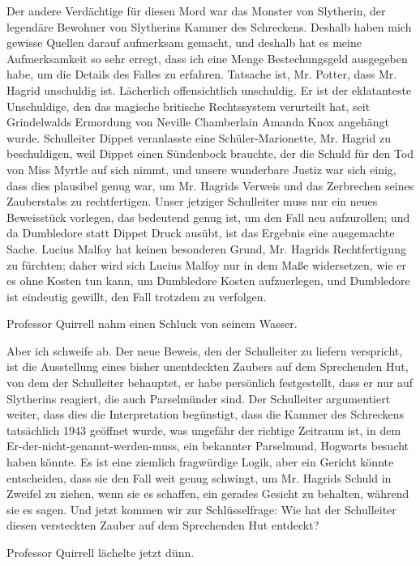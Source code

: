 \glqq{}Der andere Verdächtige für diesen Mord war das Monster von Slytherin, der
legendäre Bewohner von Slytherins Kammer des Schreckens. Deshalb haben mich
gewisse Quellen darauf aufmerksam gemacht, und deshalb hat es meine
Aufmerksamkeit so sehr erregt, dass ich eine Menge Bestechungsgeld ausgegeben
habe, um die Details des Falles zu erfahren. Tatsache ist, Mr. Potter, dass Mr.
Hagrid unschuldig ist. Lächerlich offensichtlich unschuldig. Er ist der
eklatanteste Unschuldige, den das magische britische Rechtssystem verurteilt
hat, seit Grindelwalds Ermordung von Neville Chamberlain Amanda Knox angehängt
wurde. Schulleiter Dippet veranlasste eine Schüler-Marionette, Mr. Hagrid zu
beschuldigen, weil Dippet einen Sündenbock brauchte, der die Schuld für den Tod
von Miss Myrtle auf sich nimmt, und unsere wunderbare Justiz war sich einig,
dass dies plausibel genug war, um Mr. Hagrids Verweis und das Zerbrechen seines
Zauberstabs zu rechtfertigen. Unser jetziger Schulleiter muss nur ein neues
Beweisstück vorlegen, das bedeutend genug ist, um den Fall neu aufzurollen; und
da Dumbledore statt Dippet Druck ausübt, ist das Ergebnis eine ausgemachte
Sache. Lucius Malfoy hat keinen besonderen Grund, Mr. Hagrids Rechtfertigung zu
fürchten; daher wird sich Lucius Malfoy nur in dem Maße widersetzen, wie er es
ohne Kosten tun kann, um Dumbledore Kosten aufzuerlegen, und Dumbledore ist
eindeutig gewillt, den Fall trotzdem zu verfolgen.\grqq{}

Professor Quirrell nahm einen Schluck von seinem Wasser.

\glqq{}Aber ich schweife ab. Der neue Beweis, den der Schulleiter zu liefern
verspricht, ist die Ausstellung eines bisher unentdeckten Zaubers auf dem
Sprechenden Hut, von dem der Schulleiter behauptet, er habe persönlich
festgestellt, dass er nur auf Slytherins reagiert, die auch Parselmünder sind.
Der Schulleiter argumentiert weiter, dass dies die Interpretation begünstigt,
dass die Kammer des Schreckens tatsächlich 1943 geöffnet wurde, was ungefähr der
richtige Zeitraum ist, in dem Er-der-nicht-genannt-werden-muss, ein bekannter
Parselmund, Hogwarts besucht haben könnte. Es ist eine ziemlich fragwürdige
Logik, aber ein Gericht könnte entscheiden, dass sie den Fall weit genug
schwingt, um Mr. Hagrids Schuld in Zweifel zu ziehen, wenn sie es schaffen, ein
gerades Gesicht zu behalten, während sie es sagen. Und jetzt kommen wir zur
Schlüsselfrage: Wie hat der Schulleiter diesen versteckten Zauber auf dem
Sprechenden Hut entdeckt?\grqq{}

Professor Quirrell lächelte jetzt dünn.

